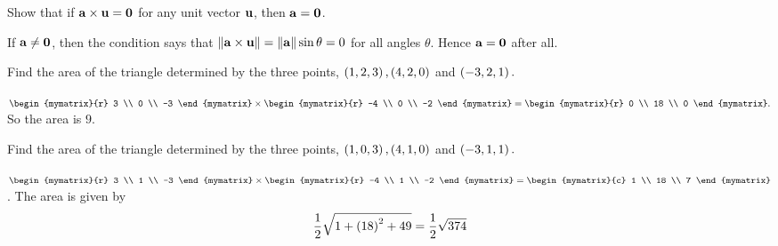 \begin{enumialphparenastyle}

\begin{ex} Show that if ${\bf a}\times {\bf u}={\bf 0}$ for any unit vector ${\bf u}
$, then ${\bf a}={\bf 0}$.
\begin{sol}
If ${\bf a}\neq {\bf 0}$, then the condition says that $\| {\bf a}\times {\bf u}\| = \| {\bf a} \| \sin \theta =0$ for all angles $\theta $. Hence ${\bf a} = {\bf 0}$ after all.
\end{sol}
\end{ex}

\begin{ex} Find the area of the triangle determined by the three points, $\left(
1,2,3\right) ,\left(4,2,0\right) $ and $\left(-3,2,1\right) .$
\begin{sol}
$\begin{mymatrix}{r}
3 \\
0 \\
-3
\end{mymatrix} \times \begin{mymatrix}{r}
 -4 \\
0 \\
-2
\end{mymatrix} =\begin{mymatrix}{r}
0 \\
18 \\
0
\end{mymatrix} .$ So the area is $9.$
\end{sol}
\end{ex}

\begin{ex} Find the area of the triangle determined by the three points, $\left(
1,0,3\right) ,\left(4,1,0\right) $ and $\left(-3,1,1\right) .$
\begin{sol}
 $\begin{mymatrix}{r}
3 \\
1 \\
-3
\end{mymatrix} \times \begin{mymatrix}{r}
 -4 \\
1 \\
-2
\end{mymatrix} =\begin{mymatrix}{c}
1 \\
18 \\
7
\end{mymatrix}$. The area is given by 
\[
\frac{1}{2}\sqrt{1+\left(18\right) ^{2}+49}=\frac{1}{2}\sqrt{374}
\]
\end{sol}
\end{ex}


\end{enumialphparenastyle}
